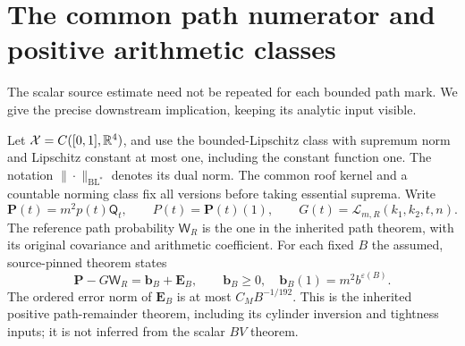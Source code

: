 \section{The common path numerator and positive arithmetic classes}
\label{sec:v74-normalization}
The scalar source estimate need not be repeated for each bounded
path mark. We give the precise downstream implication, keeping
its analytic input visible.

Let $\mathcal X=C([0,1],\mathbb R^4)$, and use the bounded-Lipschitz class
with supremum norm and Lipschitz constant at most one, including
the constant function one. The notation $\|\cdot\|_{\mathrm{BL}^*}$
denotes its dual norm. The common roof kernel and a countable
norming class fix all versions before taking essential suprema.
Write
\[
 \mathbf P(t)=m^2p(t)\mathsf Q_t,\qquad P(t)=\mathbf P(t)(1),
 \qquad G(t)=\mathcal L_{m,R}(k_1,k_2,t,n).
\]
The reference path probability $\mathsf W_R$ is the one in the
inherited path theorem, with its original covariance and arithmetic
coefficient. For each fixed $B$ the assumed, source-pinned theorem
states
\[
 \mathbf P-G\mathsf W_R=\mathbf b_B+\mathbf E_B,
 \qquad \mathbf b_B\ge0,\quad
 \mathbf b_B(1)=m^2b^{\varepsilon(B)}.
\]
The ordered error norm of $\mathbf E_B$ is at most $C_MB^{-1/192}$.
This is the inherited positive path-remainder theorem, including
its cylinder inversion and tightness inputs; it is not inferred
from the scalar $BV$ theorem.

